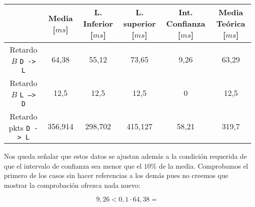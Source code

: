 \documentclass{report}[10 pt]
\begin{document}
		\begin{tabular}{| c | c | c | c | c | c |}
			\hline
			& Media [$ms$] & L. Inferior [$ms$] & L. superior [$ms$] & Int. Confianza [$ms$] & Media Teórica [$ms$]\\
			\hline
			Retardo $B$ \texttt{D -> L} & 64,38 & 55,12 & 73,65 & 9,26 & 63,29\\
			\hline
			Retardo $B$ \texttt{L --> D} & 12,5 & 12,5 & 12,5 & 0 & 12,5\\
			\hline
			Retardo pkts \texttt{D -> L} & 356,914 & 298,702 & 415,127 & 58,21 & 319,7\\
			\hline
		\end{tabular}

		Nos queda señalar que estos datos se ajustan además a la condición requerida de que el intervalo de confianza sea menor que el $10\%$ de la media. Comprobamos el primero de los casos sin hacer referencias a los demás pues no creemos que mostrar la comprobación ofrezca nada nuevo:

		$$9,26 < 0,1 \cdot 64,38 = $$
\end{document}
